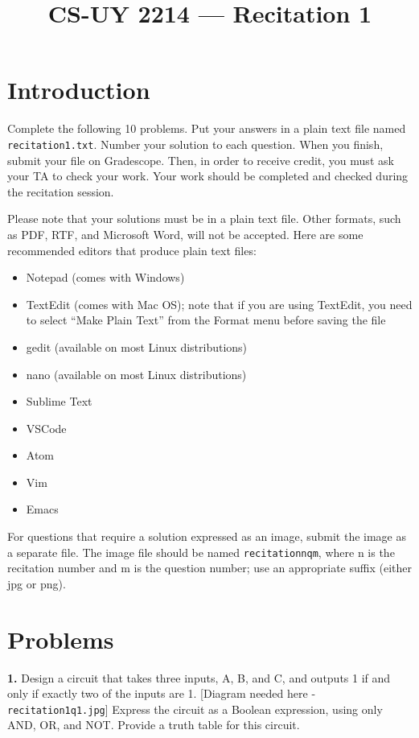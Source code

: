 \documentclass{article}
\begin{document}
\title{CS-UY 2214 — Recitation 1}
\date{}
\maketitle

\section*{Introduction}
Complete the following 10 problems. Put your answers in a plain text file named \texttt{recitation1.txt}. Number your solution to each question. When you finish, submit your file on Gradescope. Then, in order to receive credit, you must ask your TA to check your work. Your work should be completed and checked during the recitation session.

Please note that your solutions must be in a plain text file. Other formats, such as PDF, RTF, and Microsoft Word, will not be accepted. Here are some recommended editors that produce plain text files:
\begin{itemize}
    \item Notepad (comes with Windows)
    \item TextEdit (comes with Mac OS); note that if you are using TextEdit, you need to select “Make Plain Text” from the Format menu before saving the file
    \item gedit (available on most Linux distributions)
    \item nano (available on most Linux distributions)
    \item Sublime Text
    \item VSCode
    \item Atom
    \item Vim
    \item Emacs
\end{itemize}

For questions that require a solution expressed as an image, submit the image as a separate file. The image file should be named \texttt{recitationnqm}, where n is the recitation number and m is the question number; use an appropriate suffix (either jpg or png).

\section*{Problems}
\noindent\textbf{1.} Design a circuit that takes three inputs, A, B, and C, and outputs 1 if and only if exactly two of the inputs are 1.  [Diagram needed here -  \texttt{recitation1q1.jpg}] Express the circuit as a Boolean expression, using only AND, OR, and NOT. Provide a truth table for this circuit.
\end{document}
